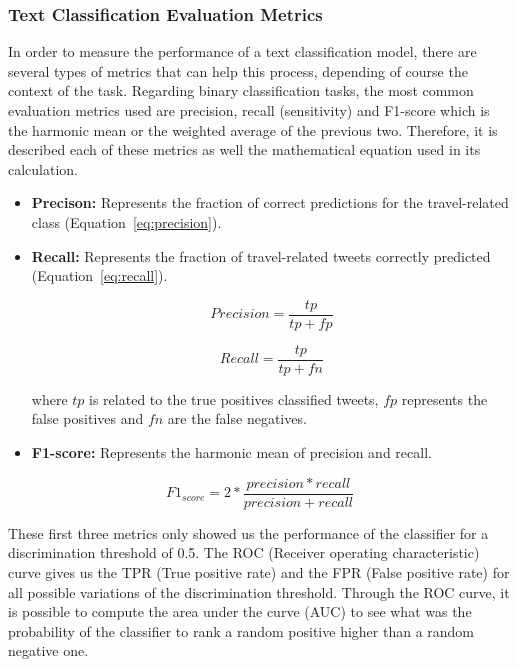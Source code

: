 \subsubsection{Text Classification Evaluation Metrics}
\label{subsubsec:evaluation_metrics}
In order to measure the performance of a text classification model, there are several types of metrics that can help this process, depending of course the context of the task. Regarding binary classification tasks, the most common evaluation metrics used are precision, recall (sensitivity) and F1-score which is the harmonic mean or the weighted average of the previous two. Therefore, it is described each of these metrics as well the mathematical equation used in its calculation.

\begin{itemize}
	\item \textbf{Precison:} Represents the fraction of correct predictions for the travel-related class (Equation~\ref{eq:precision}).
	
	\item \textbf{Recall:} Represents the fraction of travel-related tweets correctly predicted (Equation~\ref{eq:recall}).
	\begin{multicols}{2}
		\begin{equation}\label{eq:precision}
		Precision = \frac{tp}{tp+fp}
		\end{equation}
		
		\begin{equation}\label{eq:recall}
		Recall = \frac{tp}{tp+fn}
		\end{equation}
		\end{multicols}
		
		where \textbf{$tp$} is related to the true positives classified tweets, \textbf{$fp$} represents the false positives and \textbf{$fn$} are the false negatives.
		
		\item \textbf{F1-score:} Represents the harmonic mean of precision and recall.
		\end{itemize}
		
		\begin{equation}
		{F1}_{score} = 2*\frac{precision*recall}{precision+recall}
		\end{equation}
		
These first three metrics only showed us the performance of the classifier for a discrimination threshold of 0.5. The ROC (Receiver operating characteristic) curve gives us the TPR (True positive rate) and the FPR (False positive rate) for all possible variations of the discrimination threshold. Through the ROC curve, it is possible to compute the area under the curve (AUC) to see what was the probability of the classifier to rank a random positive higher than a random negative one.

